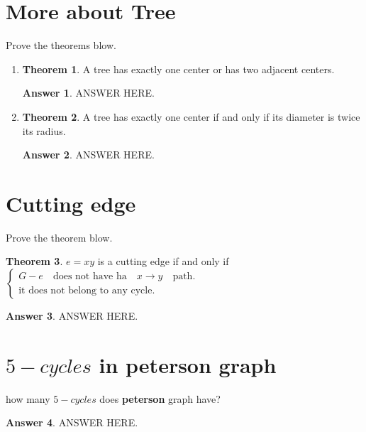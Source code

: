 \documentclass[a4paper]{article}
\renewcommand{\(}{\left(}
\renewcommand{\)}{\right)}
\theoremstyle{plain}
\theoremstyle{plain}
\theoremstyle{definition}
\newtheorem*{answer}{Answer}
\newtheorem{theorem}{Theorem}[section]
\begin{document}
\section{More about Tree}
Prove the theorems blow.
\begin{enumerate}[label=\Roman*]
  \item {
  \begin{theorem}
A tree has exactly one center or has two adjacent centers.
\end{theorem}
\begin{shaded}
\begin{answer}
ANSWER HERE.
\end{answer}
\end{shaded}
}

  \item {
  \begin{theorem}
A tree has exactly one center if and only if its diameter is twice its radius.
\end{theorem}
\begin{shaded}
\begin{answer}
ANSWER HERE.
\end{answer}
\end{shaded}
}
\end{enumerate}

\section{Cutting edge}
Prove the theorem blow.
\begin{theorem}
$e = xy$ is a cutting edge if and only if
 $
\begin{cases}
  G-e \quad \text{does not have ha} \quad x \rightarrow y \quad \text{path}. \\
\text{it does not belong to any cycle.}
\end{cases}
$
\end{theorem}
\begin{shaded}
\begin{answer}
ANSWER HERE.
\end{answer}
\end{shaded}

\section{$5-cycles$ in peterson graph}
how many $5-cycles$ does \textbf{peterson} graph have?
\begin{shaded}
\begin{answer}
ANSWER HERE.
\end{answer}
\end{shaded}
\end{document}
